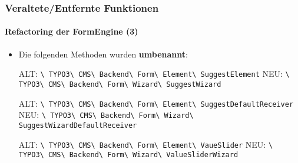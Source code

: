 \begin{frame}[fragile]
	\frametitle{Veraltete/Entfernte Funktionen}
	\framesubtitle{Refactoring der FormEngine (3)}

	\begin{itemize}

		\item Die folgenden Methoden wurden \textbf{umbenannt}:\newline

			\smaller
				ALT:\tabto{0.8cm}
					\texttt{\textbackslash
						TYPO3\textbackslash
						CMS\textbackslash
						Backend\textbackslash
						Form\textbackslash
						Element\textbackslash
						SuggestElement}\newline
				NEU:\tabto{0.8cm}
					\texttt{\textbackslash
						TYPO3\textbackslash
						CMS\textbackslash
						Backend\textbackslash
						Form\textbackslash
						Wizard\textbackslash
						SuggestWizard}\newline

				ALT:\tabto{0.8cm}
					\texttt{\textbackslash
						TYPO3\textbackslash
						CMS\textbackslash
						Backend\textbackslash
						Form\textbackslash
						Element\textbackslash
						SuggestDefaultReceiver}\newline
				NEU:\tabto{0.8cm}
					\texttt{\textbackslash
						TYPO3\textbackslash
						CMS\textbackslash
						Backend\textbackslash
						Form\textbackslash
						Wizard\textbackslash
						SuggestWizardDefaultReceiver}\newline

				ALT:\tabto{0.8cm}
					\texttt{\textbackslash
						TYPO3\textbackslash
						CMS\textbackslash
						Backend\textbackslash
						Form\textbackslash
						Element\textbackslash
						VaueSlider}\newline
				NEU:\tabto{0.8cm}
					\texttt{\textbackslash
						TYPO3\textbackslash
						CMS\textbackslash
						Backend\textbackslash
						Form\textbackslash
						Wizard\textbackslash
						ValueSliderWizard}\newline

			\normalsize

	\end{itemize}

\end{frame}


